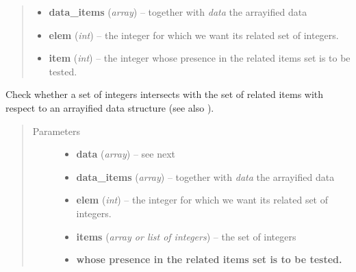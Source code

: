 \documentclass[letterpaper,10pt,english]{sphinxmanual}
\begin{document}
\begin{fulllineitems}
\begin{fulllineitems}
\begin{quote}
\begin{description}
\begin{itemize}
\item {} 
\textbf{data\_items} (\emph{array}) --
together with \emph{data} the arrayified data

\item {} 
\textbf{elem} (\emph{int}) --
the integer for which we want its related set of integers.

\item {} 
\textbf{item} (\emph{int}) --
the integer whose presence in the related items set is to be tested.

\end{itemize}

\end{description}\end{quote}

\end{fulllineitems}


\begin{fulllineitems}
\label{graf/graf:graf.GrafTask.hasitems}
Check whether a set of integers intersects with the set of related items
with respect to an arrayified data structure (see also {\hyperref[graf/graf:graf.GrafTask.getitems]{}}).
\begin{quote}\begin{description}
\item[{Parameters}] \leavevmode\begin{itemize}
\item {} 
\textbf{data} (\emph{array}) --
see next

\item {} 
\textbf{data\_items} (\emph{array}) --
together with \emph{data} the arrayified data

\item {} 
\textbf{elem} (\emph{int}) --
the integer for which we want its related set of integers.

\item {} 
\textbf{items} (\emph{array or list of integers}) --
the set of integers

\item {} 
\textbf{whose presence in the related items set is to be tested.}

\end{itemize}

\end{description}\end{quote}


\end{fulllineitems}
\end{fulllineitems}
\end{document}
